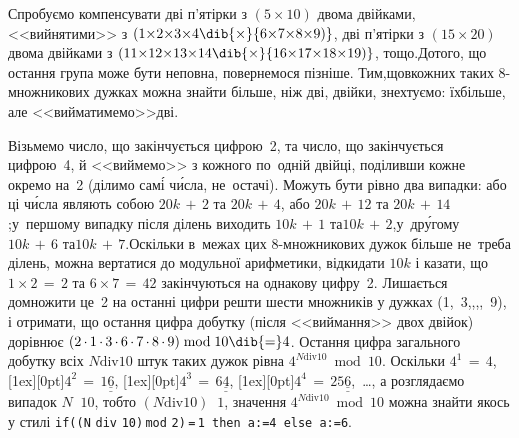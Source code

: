 Спробуємо компенсувати 
дві п'ятірки з $(5{\times}10)$ двома двійками, <<вийнятими>> з ${(1{\times}2{\times}3{\times}4}\dib{{\times}}{6{\times}7{\times}8{\times}9)}$,
дві п'ятірки з $(15{\times}20)$ двома двійками з ${(11{\times}12{\times}13{\times}14}\dib{{\times}}{16{\times}17{\times}18{\times}19)}$, 
тощо.\linebreak[2]
До\nolinebreak[3] \mbox{того}, що остання група може бути неповна, повернемося пізніше. Тим,\nolinebreak[2] що\nolinebreak[2] в\nolinebreak[3] кожних таких \mbox{8-}\nolinebreak[3]множ\-ни\-ко\-вих дужках можна знайти більше, ніж дві, двійки, знехтуємо: 
їх\nolinebreak[3] більше, але 
<<вийматимемо>>\nolinebreak[3] дві. 

Візьмемо число, що закінчується цифрою~2, та число, що закінчується цифрою~4, й <<виймемо>> з кожного по~одній двійці, поділивши кожне окремо на~2 (ділимо сам\'{і} ч\'{и}сла, не~остачі). Можуть бути рівно два випадки: або ці ч\'{и}сла являють собою $20k\,{+}\,2$ та $20k\,{+}\,4$, або $20k\,{+}\,12$ та $20k\,{+}\,14$;\linebreak[2]
у~першому випадку після ділень виходить $10k\,{+}\,1$ та\nolinebreak[3] $10k\,{+}\,2$,\linebreak[2]
у~др\'{у}гому $10k\,{+}\,6$ та\nolinebreak[3] $10k\,{+}\,7$.\linebreak[2]
Оскільки в~межах цих \mbox{8-}\nolinebreak[3]множ\-ни\-ко\-вих дужок більше не~треба ділень, можна вертатися до %
модульної арифметики, відкидати $10k$ і казати, що ${1{\times}2\,{=}\,2}$ та ${6{\times}7\,{=}\,42}$ закінчуються на однакову \mbox{цифру}~2.
Лишається домножити це~2 на останні цифри решти шести множників у дужках (1,~3,,,,~9), і отримати, що остання цифра добутку (після <<виймання>> двох двійок) дорівнює  
${(
2\,{\cdot}\,
1\,{\cdot}\,
3\,{\cdot}\,
6\,{\cdot}\,
7\,{\cdot}\,
8\,{\cdot}\,
9)\bmod10}
\dib{{=}}4$.
Остання цифра загального добутку всіх ${N\mathbin{\mathrm{div}}10}$ штук таких дужок
рівна ${4^{N\mathbin{\mathrm{div}}10}\bmod10}$. 
Оскільки 
${4^1\,{=}\,4}$,
\raisebox{0pt}[1ex][0pt]{${4^2\,{=}\,1\underline{\underline{6}}}$},
\raisebox{0pt}[1ex][0pt]{${4^3\,{=}\,6\underline{\underline{4}}}$},
\raisebox{0pt}[1ex][0pt]{${4^4\,{=}\,25\underline{\underline{6}}}$},~\dots,
а розглядаємо випадок
${N\,{\>}\,10}$, тобто ${(N\mathbin{\mathrm{div}}10)\,{\>}\,1}$,
значення ${4^{N\mathbin{\mathrm{div}}10}\bmod10}$ можна знайти %
якось у стилі \texttt{if\nolinebreak[3] \mbox{((N$\,\,$div$\,\,$10)$\,$mod$\,\,$2)$\,$=$\,$1} \mbox{then} \mbox{a:=4} \mbox{else} \mbox{a:=6}}.

